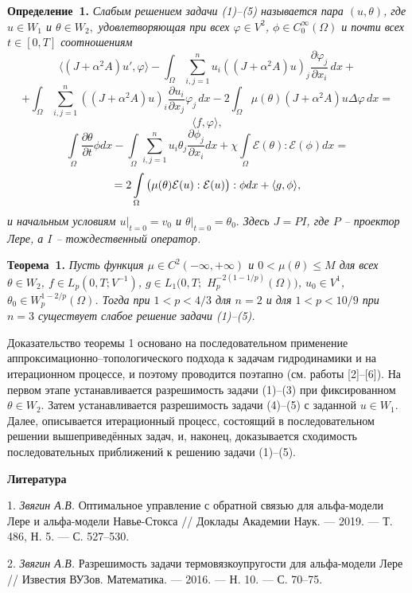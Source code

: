 \textbf{Определение~1.} {\it
	Слабым решением задачи (1)--(5) называется пара $(u, \theta)$, где $u \in W_1$ и $\theta \in W_2,$ удовлетворяющая при всех $\varphi \in V^2$, $ \phi \in C^{\infty}_0(\Omega)$ и почти всех $t\in [0,T]$ соотношениям
$$
	\langle (J+\alpha^2A)u', \varphi\rangle - \int_\Omega\sum_{i, j=1}^nu_i((J+\alpha^2A)u)_j
	\frac{\partial\varphi_j}{\partial x_i}\,dx +$$
	$$+ \int_\Omega\sum_{i, j=1}^n((J+\alpha^2A)u)_i\frac{\partial u_i}{\partial x_j}
	\varphi_j\,dx
	- 2\int_\Omega \mu(\theta) (J+\alpha^2A)u\Delta\varphi\,dx=$$
	$$
	\langle f, \varphi\rangle,$$ $$
	\int\limits_\Omega \frac{\partial\theta}{\partial t}\phi dx-\int\limits_\Omega\sum\limits_{i,j=1}^n
	u_i\theta_j\frac{\partial \phi_j}{\partial x_i} dx+\chi\int\limits_\Omega
	\mathcal{E}(\theta):\mathcal{E}( \phi) dx=$$ $$= 2\int\limits_\Omega\big{(}{\mu}(\theta)  \mathcal {E}(u): \mathcal {E}(u)\big{)}:\phi dx+\langle g,\phi\rangle,\label{f4}
$$
	и начальным условиям $u|_{t=0} = v_0$ и $\theta|_{t=0}=\theta_0.$ Здесь $J=PI$, где $P$ -- проектор Лере, а $I$  -- тождественный оператор.}

\textbf{Теорема~1.} {\it  Пусть  функция $\mu \in C^2(-\infty,+\infty)$ и $0<\mu(\theta)\leq M$ для всех $\theta \in W_2$, $f \in L_p(0,T;V^{-1})$, $g \in L_1(0,T;$ $H^{-2(1-1/p)}_p(\Omega))$, $u_0 \in V^1$, $\theta_0 \in W^{1-2/p}_p(\Omega)$. Тогда при $1<p<4/3$ для $n=2$ и для $1<p<10/9$ при $n=3$ существует слабое решение задачи (1)--(5).}

Доказательство теоремы 1 основано на последовательном применение аппроксимационно--топологического подхода к задачам гидродинамики и на итерационном процессе, и поэтому проводится поэтапно (см. работы [2]--[6]). На первом этапе устанавливается разрешимость задачи (1)--(3) при фиксированном  $\theta \in W_2$. Затем устанавливается разрешимость задачи (4)--(5) с заданной $u \in W_1$. Далее, описывается итерационный процесс, состоящий в последовательном решении вышеприведённых задач, и, наконец, доказывается сходимость последовательных приближений к решению задачи (1)--(5).




\smallskip \centerline {\bf Литература} \nopagebreak

1. {\it Звягин А.В.} Оптимальное управление с обратной связью для альфа-модели Лере и альфа-модели Навье-Стокса // Доклады Академии Наук. --- 2019. --- Т. 486, Н. 5. --- С. 527--530.

2. {\it Звягин А.В.} Разрешимость задачи термовязкоупругости для альфа-модели Лере // Известия ВУЗов. Математика. --- 2016. --- Н. 10. --- С. 70--75.

